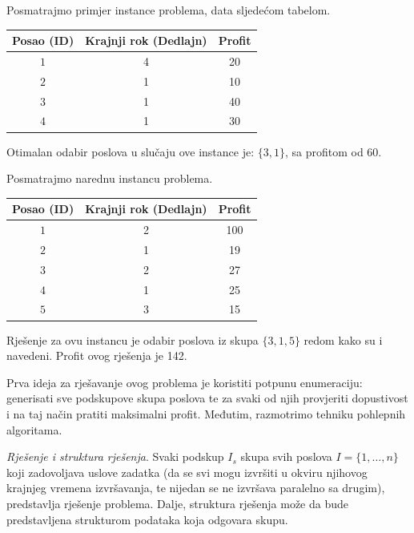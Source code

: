 \begin{solution}
	Posmatrajmo primjer instance problema, data sljedećom tabelom.
\begin{center}
 
 
	\begin{tabular}{ccc }
	 \centering
	Posao (ID) & Krajnji rok (Dedlajn) & Profit \\ \hline \hline
	$1$	&	4	&	20 \\
	$2$	&	1	&	10\\
	$3$	&	1	&	40\\
	$4$	&	1	&	30\\ \hline
	\end{tabular}
\end{center}

Otimalan odabir poslova u slučaju ove instance je: $\{3, 1\}$, sa profitom od 60. 

Posmatrajmo narednu instancu problema.  
\begin{center}
	
	
	\begin{tabular}{ccc }
		\centering
		Posao (ID) & Krajnji rok (Dedlajn) & Profit \\ \hline \hline
		$1$	&	2	&	100 \\
		$2$	&	1	&	19\\
		$3$	&	2	&	27\\
		$4$	&	1	&	25\\  
	 $5$	&	3	&	15\\   \hline
	\end{tabular}
\end{center}
	
\end{solution}

Rješenje za ovu instancu je odabir poslova iz skupa $\{3, 1,5 \}$ redom kako su i navedeni. Profit ovog rješenja je 142. 


Prva ideja za rješavanje ovog problema je koristiti potpunu enumeraciju: generisati sve podskupove
skupa poslova te za svaki od njih provjeriti dopustivost i na taj način pratiti  
maksimalni profit. Međutim, razmotrimo  tehniku pohlepnih algoritama.   \\ \vspace{0.2cm}

\textit{Rješenje i struktura rješenja}. Svaki podskup $I_s$ skupa svih poslova $I=\{1,\ldots, n\}$ koji zadovoljava uslove zadatka (da se svi mogu izvršiti u okviru njihovog krajnjeg vremena izvršavanja, te nijedan se ne izvršava paralelno sa drugim),  predstavlja rješenje problema. Dalje, struktura rješenja može da bude predstavljena strukturom podataka koja odgovara skupu. 

